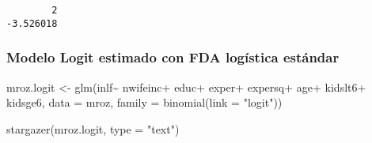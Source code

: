 \documentclass[
  letterpaper,
  DIV=11,
  numbers=noendperiod]{scrreprt}
\newenvironment{Shaded}{\begin{snugshade}}{\end{snugshade}}
\newcommand{\AttributeTok}[1]{\textcolor[rgb]{0.40,0.45,0.13}{#1}}
\newcommand{\FunctionTok}[1]{\textcolor[rgb]{0.28,0.35,0.67}{#1}}
\newcommand{\NormalTok}[1]{\textcolor[rgb]{0.00,0.23,0.31}{#1}}
\newcommand{\OtherTok}[1]{\textcolor[rgb]{0.00,0.23,0.31}{#1}}
\newcommand{\SpecialCharTok}[1]{\textcolor[rgb]{0.37,0.37,0.37}{#1}}
\newcommand{\StringTok}[1]{\textcolor[rgb]{0.13,0.47,0.30}{#1}}
\begin{document}
\begin{verbatim}
        2 
-3.526018 
\end{verbatim}

\subsubsection{Modelo Logit estimado con FDA logística
estándar}\label{modelo-logit-estimado-con-fda-loguxedstica-estuxe1ndar}

\begin{Shaded}
\begin{Highlighting}[]
\NormalTok{mroz.logit }\OtherTok{\textless{}{-}} \FunctionTok{glm}\NormalTok{(inlf}\SpecialCharTok{\textasciitilde{}}
\NormalTok{                 nwifeinc}\SpecialCharTok{+}
\NormalTok{                 educ}\SpecialCharTok{+}
\NormalTok{                 exper}\SpecialCharTok{+}
\NormalTok{                 expersq}\SpecialCharTok{+}
\NormalTok{                 age}\SpecialCharTok{+}
\NormalTok{                 kidslt6}\SpecialCharTok{+}
\NormalTok{                 kidsge6,}
               \AttributeTok{data =}\NormalTok{ mroz,}
               \AttributeTok{family =} \FunctionTok{binomial}\NormalTok{(}\AttributeTok{link =} \StringTok{"logit"}\NormalTok{))}

\FunctionTok{stargazer}\NormalTok{(mroz.logit, }\AttributeTok{type =} \StringTok{"text"}\NormalTok{)}
\end{Highlighting}
\end{Shaded}
\end{document}

